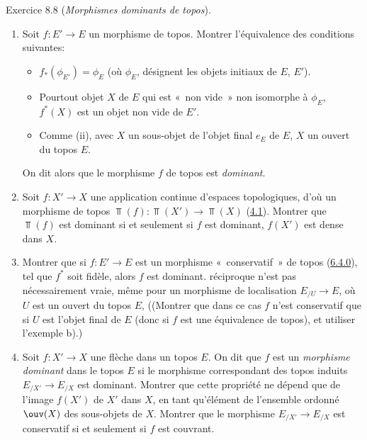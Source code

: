 \documentclass[10pt]{../fichiers-configuration-latex/smfart}
\begin{document}
\begin{enonce*}[remark]{Exercice 8.8}
(\emph{Morphismes dominants de topos}).
\begin{enumerate}
\renewcommand{\theenumi}{\alph{enumi}}
\renewcommand{\labelenumi}{\theenumi)}
\item Soit $f:E'\rightarrow E$ un morphisme de topos. Montrer
l'équivalence des conditions suivantes:

\begin{itemize}
\item[(i)] $f_{\ast}(\phi_{E'})=\phi_E$ (où $\phi_E$, 
désignent les objets initiaux de $E$, $E'$).

\item[(ii)] Pour\pageoriginale tout objet $X$ de $E$ qui est « non
vide »  \ie non isomorphe à $\phi_E$, $f^{\ast}(X)$ est un objet
non vide de $E'$.

\item[$\rm(ii')$] Comme (ii), avec $X$ un sous-objet de l'objet final
$e_E$ de $E$, \ie $X$ un ouvert du topos $E$.
\end{itemize}

On dit alors que le morphisme $f$ de topos est \emph{dominant}.

\item Soit $f:X'\rightarrow X$ une application continue d'espaces
topologiques, d'où un morphisme de topos
$\Top(f):\Top(X')\rightarrow \Top(X)$ (\hyperref[IV.subsec4.1]{4.1}). Montrer
que $\Top(f)$ est dominant si et seulement si $f$ est dominant, \ie
$f(X')$ est dense dans $X$.

\item Montrer que si $f:E'\rightarrow E$ est un morphisme « conservatif »  de topos (\hyperref[IV.subsubsec6.4.0]{6.4.0}), \ie tel que
$f^{\ast}$ soit fidèle, alors $f$ est dominant. 
réciproque n'est pas nécessairement vraie, même pour un
morphisme de
localisation $E_{/U}\rightarrow E$, où $U$ est un ouvert du topos
$E$, ((Montrer que dans ce cas $f$ n'est conservatif que si $U$ est
l'objet final de $E$ (donc si $f$ est une équivalence de topos), et
utiliser l'exemple b).)

\item Soit $f:X'\rightarrow X$ une flèche dans un topos $E$. On dit
que $f$ est un \emph{morphisme dominant} dans le topos $E$ si le
morphisme correspondant des topos induits $E_{/X'}\rightarrow
E_{/X}$  est dominant. Montrer que cette
propriété ne
dépend que de l'image $f(X')$ de $X'$ dans $X$, en tant qu'élément
de l'ensemble ordonné $\ouv(X)$ des sous-objets de $X$. Montrer que
le morphisme $E_{/X'}\rightarrow E_{/X}$ est conservatif si et
seulement si $f$ est couvrant.
\end{enumerate}
\end{enonce*}
\end{document}

